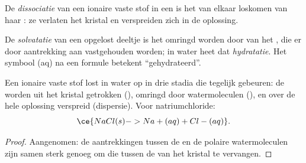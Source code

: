 \begin{definition}[Dissociatie]\label{def:g11:dissolution:dissociation}
De \emph{dissociatie} van een ionaire vaste stof in een
 is het van elkaar loskomen van haar : ze verlaten het
kristal en verspreiden zich in de oplossing.
\end{definition}

\begin{definition}\label{def:g11:dissolution:solvation}
De \emph{solvatatie} van een opgelost deeltje is het
omringd worden door  van het , die er door
aantrekking aan vastgehouden worden; in water heet dat
\emph{hydratatie}. Het symbool (aq) na een formule
betekent ``gehydrateerd''.
\end{definition}

\begin{proposition}\label{prop:g11:dissolution:stages}
Een ionaire vaste stof lost in water op in drie stadia die tegelijk
gebeuren: de  worden uit het kristal getrokken (),
omringd door watermoleculen (), en over de hele oplossing
verspreid (dispersie). Voor natriumchloride:
\[
  \ce{NaCl(s) -> Na+(aq) + Cl-(aq)} .
\]
\end{proposition}

\begin{proof}
Aangenomen: de aantrekkingen tussen de  en de polaire watermoleculen
zijn samen sterk genoeg om die tussen de  van het kristal te
vervangen.
\end{proof}


